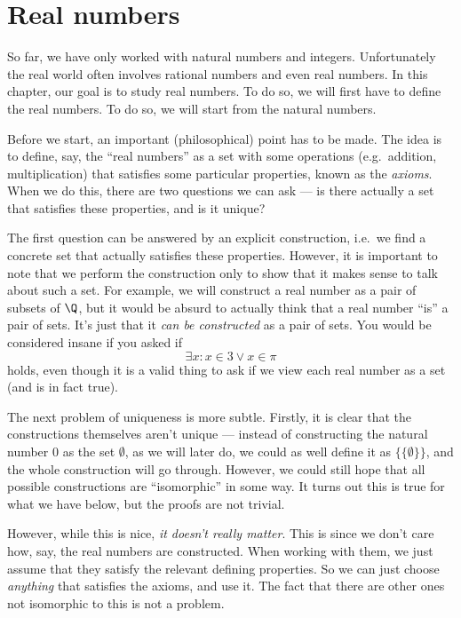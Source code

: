 \documentclass[a4paper]{article}
\begin{document}
\section{Real numbers}
So far, we have only worked with natural numbers and integers. Unfortunately the real world often involves rational numbers and even real numbers. In this chapter, our goal is to study real numbers. To do so, we will first have to define the real numbers. To do so, we will start from the natural numbers.

Before we start, an important (philosophical) point has to be made. The idea is to define, say, the ``real numbers'' as a set with some operations (e.g.\ addition, multiplication) that satisfies some particular properties, known as the \emph{axioms}. When we do this, there are two questions we can ask --- is there actually a set that satisfies these properties, and is it unique?

The first question can be answered by an explicit construction, i.e.\ we find a concrete set that actually satisfies these properties. However, it is important to note that we perform the construction only to show that it makes sense to talk about such a set. For example, we will construct a real number as a pair of subsets of $\Q$, but it would be absurd to actually think that a real number ``is'' a pair of sets. It's just that it \emph{can be constructed} as a pair of sets. You would be considered insane if you asked if
\[
  \exists x: x \in 3 \vee x \in \pi
\]
holds, even though it is a valid thing to ask if we view each real number as a set (and is in fact true).

The next problem of uniqueness is more subtle. Firstly, it is clear that the constructions themselves aren't unique --- instead of constructing the natural number $0$ as the set $\emptyset$, as we will later do, we could as well define it as $\{\{\emptyset\}\}$, and the whole construction will go through. However, we could still hope that all possible constructions are ``isomorphic'' in some way. It turns out this is true for what we have below, but the proofs are not trivial.

However, while this is nice, \emph{it doesn't really matter}. This is since we don't care how, say, the real numbers are constructed. When working with them, we just assume that they satisfy the relevant defining properties. So we can just choose \emph{anything} that satisfies the axioms, and use it. The fact that there are other ones not isomorphic to this is not a problem.
\end{document}
